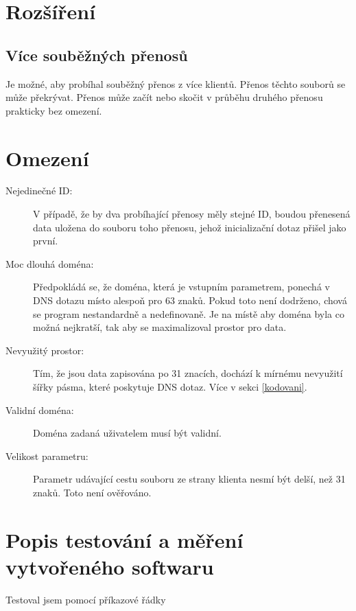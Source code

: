 \documentclass[11pt]{article}
\begin{document}
\section{Rozšíření}
\subsection{Více souběžných přenosů}
Je možné, aby probíhal souběžný přenos z více klientů. Přenos těchto souborů se může překrývat. Přenos může začít nebo skočit v průběhu druhého přenosu prakticky bez omezení. 
\section{Omezení}
\begin{description}
    \item[Nejedinečné ID:]V případě, že by dva probíhající přenosy měly stejné ID, boudou přenesená data uložena do souboru toho přenosu, jehož inicializační dotaz přišel jako první.
    \item[Moc dlouhá doména:]Předpokládá se, že doména, která je vstupním parametrem, ponechá v DNS dotazu místo alespoň pro 63 znaků. Pokud toto není dodrženo, chová se program nestandardně a nedefinovaně. Je na místě aby doména byla co možná nejkratší, tak aby se maximalizoval prostor pro data.
    \item[Nevyužitý prostor:] Tím, že jsou data zapisována po 31 znacích, dochází k mírnému nevyužití šířky pásma, které poskytuje DNS dotaz. Více v sekci \ref{kodovani}.
    \item[Validní doména:] Doména zadaná uživatelem musí být validní.
    \item[Velikost parametru:] Parametr udávající cestu souboru ze strany klienta nesmí být delší, než 31 znaků. Toto není ověřováno.
\end{description}



\section{Popis testování a měření vytvořeného softwaru}
Testoval jsem pomocí příkazové řádky 
\end{document}
